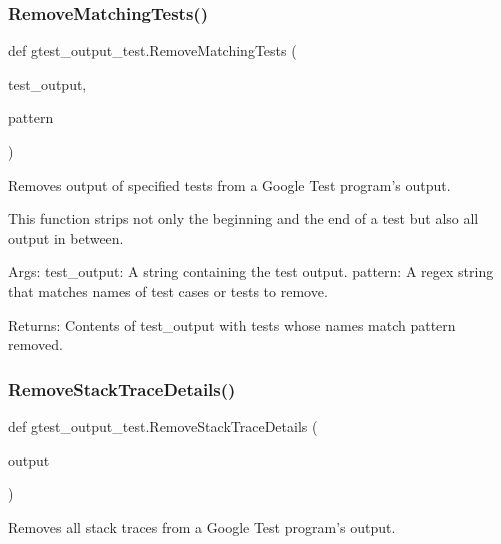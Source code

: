 \subsubsection{\texorpdfstring{Remove\+Matching\+Tests()}{RemoveMatchingTests()}}
{\footnotesize\ttfamily def gtest\+\_\+output\+\_\+test.\+Remove\+Matching\+Tests (\begin{DoxyParamCaption}\item[{}]{test\+\_\+output,  }\item[{}]{pattern }\end{DoxyParamCaption})}

\begin{DoxyVerb}Removes output of specified tests from a Google Test program's output.

This function strips not only the beginning and the end of a test but also
all output in between.

Args:
  test_output:       A string containing the test output.
  pattern:           A regex string that matches names of test cases or
                     tests to remove.

Returns:
  Contents of test_output with tests whose names match pattern removed.
\end{DoxyVerb}
 \mbox{\label{namespacegtest__output__test_a15bbf618beea12685dc5c9630ec18120}} 
\subsubsection{\texorpdfstring{Remove\+Stack\+Trace\+Details()}{RemoveStackTraceDetails()}}
{\footnotesize\ttfamily def gtest\+\_\+output\+\_\+test.\+Remove\+Stack\+Trace\+Details (\begin{DoxyParamCaption}\item[{}]{output }\end{DoxyParamCaption})}

\begin{DoxyVerb}Removes all stack traces from a Google Test program's output.\end{DoxyVerb}
 \mbox{\label{namespacegtest__output__test_a5fa2201583a11780279aa720dea5dd4e}} 
